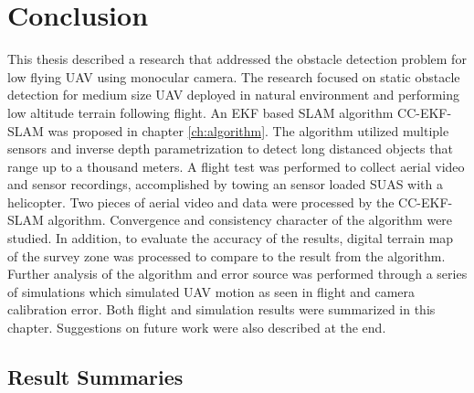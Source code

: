 \chapter{Conclusion}\label{ch:conclusion}
This thesis described a research that addressed the obstacle detection
problem for low flying UAV using monocular camera. The research
focused on static obstacle detection for medium size UAV deployed in
natural environment and performing low altitude terrain following
flight. An EKF based SLAM algorithm CC-EKF-SLAM was proposed in
chapter \ref{ch:algorithm}. The algorithm utilized multiple sensors
and inverse depth parametrization to detect long distanced objects
that range up to a thousand meters. A flight test was performed to
collect aerial video and sensor recordings, accomplished by towing an
sensor loaded SUAS with a helicopter. Two pieces of aerial video and
data were processed by the CC-EKF-SLAM algorithm. Convergence and
consistency character of the algorithm were studied. In addition, to
evaluate the accuracy of the results, digital terrain map of the
survey zone was processed to compare to the result from the algorithm.
Further analysis of the algorithm and error source was performed
through a series of simulations which simulated UAV motion as seen in
flight and camera calibration error. Both flight and simulation
results were summarized in this chapter. Suggestions on future work
were also described at the end.

\section{Result Summaries}
